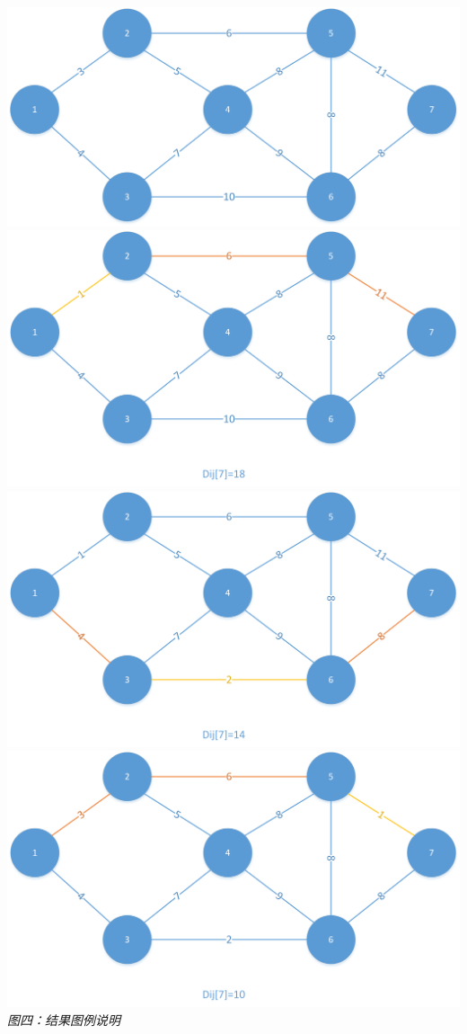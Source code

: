 \documentclass[UTF8,a4paper]{article}
\begin{document}
\begin{center}
\includegraphics[scale=0.5]{dym.png}\\
\includegraphics[scale=0.5]{dm3.png}\\
\includegraphics[scale=0.5]{dm4.png}
\includegraphics[scale=0.5]{dm5.png}\\
\textit{图四：结果图例说明}
\end{center}
\newpage
\end{document}

